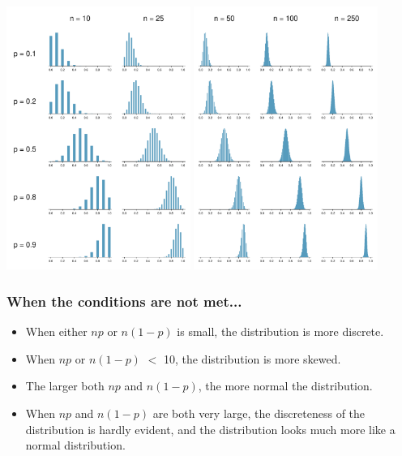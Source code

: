 \begin{frame}


\begin{center}
\includegraphics[width=0.45\textwidth]{5-1_point_est_sampling_var/figures/clt_prop_grid/clt_prop_grid_1.pdf}
\includegraphics[width=0.45\textwidth]{5-1_point_est_sampling_var/figures/clt_prop_grid/clt_prop_grid_2.pdf}
\end{center}

\end{frame}


\begin{frame}
\frametitle{When the conditions are not met...}

\begin{itemize}

\item When either $np$ or $n(1-p)$ is small, the distribution is more discrete.
\item When $np$ or $n(1-p)$ $<$ 10, the distribution is more skewed.
\item The larger both $np$ and $n(1-p)$, the more normal the distribution.
\item When $np$ and $n(1-p)$ are both very large, the discreteness of the distribution is hardly evident, and the distribution looks much more like a normal distribution.

\end{itemize}

\end{frame}

